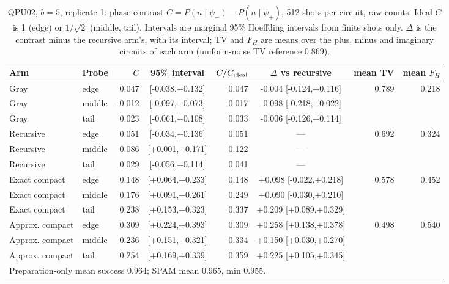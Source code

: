 \begin{table}[htbp]\centering\scriptsize\setlength{\tabcolsep}{3pt}
\caption{QPU02, $b=5$, replicate 1: phase contrast $C=P(n\mid\psi_-)-P(n\mid\psi_+)$, 512 shots per circuit, raw counts. Ideal $C$ is 1 (edge) or $1/\sqrt2$ (middle, tail). Intervals are marginal 95\% Hoeffding intervals from finite shots only. $\Delta$ is the contrast minus the recursive arm's, with its interval; TV and $F_H$ are means over the plus, minus and imaginary circuits of each arm (uniform-noise TV reference 0.869).}\label{tab:q2c-b5r1}
\begin{tabular}{llrcrcrr}\toprule Arm & Probe & $C$ & 95\% interval & $C/C_{\rm ideal}$ & $\Delta$ vs recursive & mean TV & mean $F_H$\\\midrule
Gray & edge & 0.047 & [-0.038,+0.132] & 0.047 & -0.004 [-0.124,+0.116] & 0.789 & 0.218\\
Gray & middle & -0.012 & [-0.097,+0.073] & -0.017 & -0.098 [-0.218,+0.022] &  & \\
Gray & tail & 0.023 & [-0.061,+0.108] & 0.033 & -0.006 [-0.126,+0.114] &  & \\
\midrule
Recursive & edge & 0.051 & [-0.034,+0.136] & 0.051 & --- & 0.692 & 0.324\\
Recursive & middle & 0.086 & [+0.001,+0.171] & 0.122 & --- &  & \\
Recursive & tail & 0.029 & [-0.056,+0.114] & 0.041 & --- &  & \\
\midrule
Exact compact & edge & 0.148 & [+0.064,+0.233] & 0.148 & +0.098 [-0.022,+0.218] & 0.578 & 0.452\\
Exact compact & middle & 0.176 & [+0.091,+0.261] & 0.249 & +0.090 [-0.030,+0.210] &  & \\
Exact compact & tail & 0.238 & [+0.153,+0.323] & 0.337 & +0.209 [+0.089,+0.329] &  & \\
\midrule
Approx. compact & edge & 0.309 & [+0.224,+0.393] & 0.309 & +0.258 [+0.138,+0.378] & 0.498 & 0.540\\
Approx. compact & middle & 0.236 & [+0.151,+0.321] & 0.334 & +0.150 [+0.030,+0.270] &  & \\
Approx. compact & tail & 0.254 & [+0.169,+0.339] & 0.359 & +0.225 [+0.105,+0.345] &  & \\
\multicolumn{8}{l}{Preparation-only mean success 0.964; SPAM mean 0.965, min 0.955.}\\
\bottomrule\end{tabular}\end{table}

